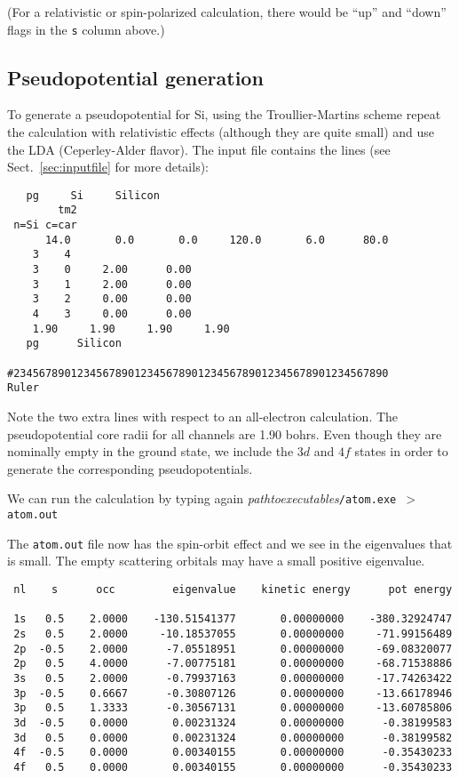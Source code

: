 \documentclass[11pt]{article}
\begin{document}
(For a relativistic or spin-polarized calculation, there would be
``up'' and ``down'' flags in the {\tt s} column above.)

\subsection{Pseudopotential generation}

To generate a pseudopotential for Si, using
the Troullier-Martins scheme repeat the calculation with relativistic 
effects (although they are quite small) and
use the LDA (Ceperley-Alder flavor). The input file
contains the lines (see Sect.~\ref{sec:inputfile} for more
details):

\begin{verbatim}
   pg     Si     Silicon
        tm2
 n=Si c=car 
      14.0       0.0       0.0     120.0       6.0      80.0
    3    4
    3    0     2.00      0.00
    3    1     2.00      0.00
    3    2     0.00      0.00
    4    3     0.00      0.00
    1.90     1.90     1.90     1.90
   pg      Silicon
                                     
#23456789012345678901234567890123456789012345678901234567890      Ruler
\end{verbatim}

Note the two extra lines with respect to an all-electron calculation.
The pseudopotential core radii for all channels are 1.90 bohrs. Even
though they are nominally empty in the ground state, we include the
$3d$ and $4f$ states in order to generate the corresponding
pseudopotentials. 

We can run the calculation by typing again 
\textit{pathtoexecutables}\texttt{/atom.exe $>$ atom.out}

The {\tt atom.out} file now has the spin-orbit effect and we
see in the eigenvalues that is small.  The empty scattering orbitals
may have a small positive eigenvalue.

\begin{verbatim}
 nl    s      occ         eigenvalue    kinetic energy      pot energy

 1s   0.5    2.0000    -130.51541377       0.00000000    -380.32924747
 2s   0.5    2.0000     -10.18537055       0.00000000     -71.99156489
 2p  -0.5    2.0000      -7.05518951       0.00000000     -69.08320077
 2p   0.5    4.0000      -7.00775181       0.00000000     -68.71538886
 3s   0.5    2.0000      -0.79937163       0.00000000     -17.74263422
 3p  -0.5    0.6667      -0.30807126       0.00000000     -13.66178946
 3p   0.5    1.3333      -0.30567131       0.00000000     -13.60785806
 3d  -0.5    0.0000       0.00231324       0.00000000      -0.38199583
 3d   0.5    0.0000       0.00231324       0.00000000      -0.38199582
 4f  -0.5    0.0000       0.00340155       0.00000000      -0.35430233
 4f   0.5    0.0000       0.00340155       0.00000000      -0.35430233
\end{verbatim}
\end{document}
